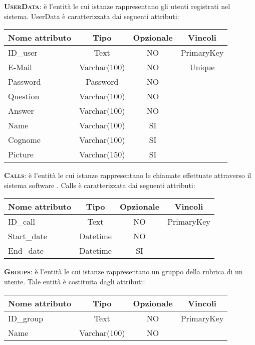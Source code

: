 \begin{description}
	\item{\scshape\bfseries UserData}: è l'entità le cui istanze rappresentano gli utenti registrati nel sistema. UserData è caratterizzata dai seguenti attributi:

\begin{center}
\begin{tabular}{lccc}
\toprule
Nome attributo & Tipo & Opzionale & Vincoli\\
\midrule %
ID\_user & Text & NO & PrimaryKey\\
E-Mail & Varchar(100) & NO & Unique\\
Password & Password & NO &\\
Question & Varchar(100) & NO &\\
Answer & Varchar(100) & NO &\\
Name & Varchar(100) & SI &\\
Cognome & Varchar(100) & SI &\\
Picture & Varchar(150) & SI &\\
\bottomrule
\end{tabular}
\end{center}

	\item{\scshape\bfseries Calls}: è l'entità le cui istanze rappresentano le chiamate effettuate attraverso il sistema software \caName. Calls è caratterizzata dai seguenti attributi:

\begin{center}
\begin{tabular}{lccc}
\toprule
Nome attributo & Tipo & Opzionale & Vincoli\\
\midrule %
ID\_call & Text & NO & PrimaryKey\\
Start\_date & Datetime & NO & \\
End\_date & Datetime & SI & \\
\bottomrule
\end{tabular}
\end{center}

	\item{\scshape\bfseries Groups}: è l'entità le cui istanze rappresentano un gruppo della rubrica di un utente. Tale entità è costituita dagli attributi:

\begin{center}
\begin{tabular}{lccc}
\toprule
Nome attributo & Tipo & Opzionale & Vincoli\\
\midrule %
ID\_group & Text & NO & PrimaryKey\\
Name & Varchar(100) & NO &\\
\bottomrule
\end{tabular}
\end{center}	
	

\end{description}
